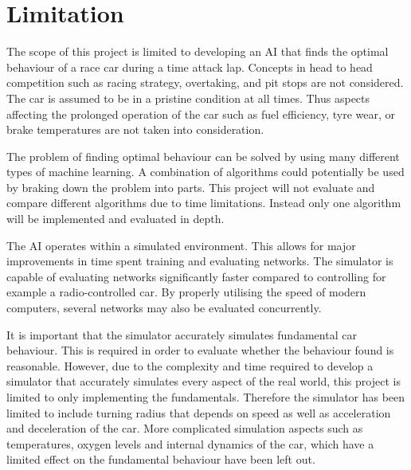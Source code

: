 \section{Limitation}
The scope of this project is limited to developing an AI that finds the optimal behaviour of a race car during a time attack lap. Concepts in head to head competition such as racing strategy, overtaking, and pit stops are not considered. The car is assumed to be in a pristine condition at all times. Thus aspects affecting the prolonged operation of the car such as fuel efficiency, tyre wear, or brake temperatures are not taken into consideration. 

The problem of finding optimal behaviour can be solved by using many different types of machine learning. A combination of algorithms could potentially be used by braking down the problem into parts. This project will not evaluate and compare different algorithms due to time limitations. Instead only one algorithm will be implemented and evaluated in depth.


The AI operates within a simulated environment. This allows for major improvements in time spent training and evaluating networks. The simulator is capable of evaluating networks significantly faster compared to controlling for example a radio-controlled car. By properly utilising the speed of modern computers, several networks may also be evaluated concurrently. 

It is important that the simulator accurately simulates fundamental car behaviour. This is required in order to evaluate whether the behaviour found is reasonable. However, due to the complexity and time required to develop a simulator that accurately simulates every aspect of the real world, this project is limited to only implementing the fundamentals. Therefore the simulator has been limited to include turning radius that depends on speed as well as acceleration and deceleration of the car. More complicated simulation aspects such as temperatures, oxygen levels and internal dynamics of the car, which have a limited effect on the fundamental behaviour have been left out.

